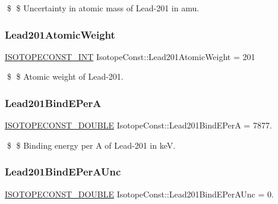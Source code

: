 \$ \$ Uncertainty in atomic mass of Lead-\/201 in amu. \mbox{\label{group___isotope_const-_lead-_pb201_gaa4a7c6bf0153b4d30152625c8d425f65}} 
\subsubsection{\texorpdfstring{Lead201\+Atomic\+Weight}{Lead201AtomicWeight}}
{\footnotesize\ttfamily \mbox{\hyperlink{group___isotope_const-_macros_ga5f18360b3e99483a35c32d789e62621c}{I\+S\+O\+T\+O\+P\+E\+C\+O\+N\+S\+T\+\_\+\+I\+NT}} Isotope\+Const\+::\+Lead201\+Atomic\+Weight = 201}

\$ \$ Atomic weight of Lead-\/201. \mbox{\label{group___isotope_const-_lead-_pb201_ga13f400b5bc4ca406c0abf203b841f32b}} 
\subsubsection{\texorpdfstring{Lead201\+Bind\+E\+PerA}{Lead201BindEPerA}}
{\footnotesize\ttfamily \mbox{\hyperlink{group___isotope_const-_macros_ga8f45a7272ce02c0b4c65c44636ed719a}{I\+S\+O\+T\+O\+P\+E\+C\+O\+N\+S\+T\+\_\+\+D\+O\+U\+B\+LE}} Isotope\+Const\+::\+Lead201\+Bind\+E\+PerA = 7877.}

\$ \$ Binding energy per A of Lead-\/201 in keV. \mbox{\label{group___isotope_const-_lead-_pb201_gab512059cb590b3b5e84e77af5e016344}} 
\subsubsection{\texorpdfstring{Lead201\+Bind\+E\+Per\+A\+Unc}{Lead201BindEPerAUnc}}
{\footnotesize\ttfamily \mbox{\hyperlink{group___isotope_const-_macros_ga8f45a7272ce02c0b4c65c44636ed719a}{I\+S\+O\+T\+O\+P\+E\+C\+O\+N\+S\+T\+\_\+\+D\+O\+U\+B\+LE}} Isotope\+Const\+::\+Lead201\+Bind\+E\+Per\+A\+Unc = 0.}

